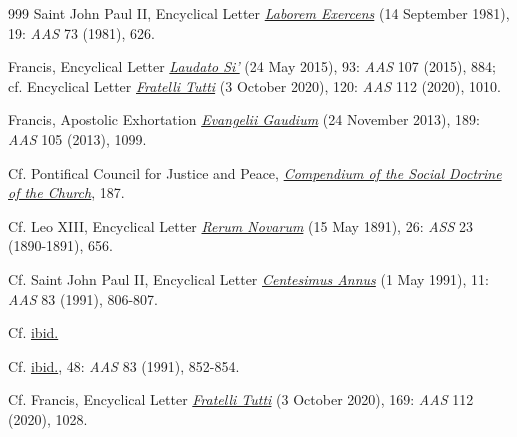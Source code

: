 \documentclass{article}
\begin{document}
\begin{thebibliography}{999}
 Saint John Paul II, Encyclical Letter \href{https://www.vatican.va/content/john-paul-ii/en/encyclicals/documents/hf_jp-ii_enc_14091981_laborem-exercens.html}{\emph{Laborem Exercens}} (14 September 1981), 19: \emph{AAS} 73 (1981), 626.

 Francis, Encyclical Letter \href{https://www.vatican.va/content/francesco/en/encyclicals/documents/papa-francesco_20150524_enciclica-laudato-si.html}{\emph{Laudato Si'}} (24 May 2015), 93: \emph{AAS} 107 (2015), 884; cf. Encyclical Letter \href{https://www.vatican.va/content/francesco/en/encyclicals/documents/papa-francesco_20201003_enciclica-fratelli-tutti.html}{\emph{Fratelli Tutti}} (3 October 2020), 120: \emph{AAS} 112 (2020), 1010.

 Francis, Apostolic Exhortation \href{https://www.vatican.va/content/francesco/en/apost_exhortations/documents/papa-francesco_esortazione-ap_20131124_evangelii-gaudium.html}{\emph{Evangelii Gaudium}} (24 November 2013), 189: \emph{AAS} 105 (2013), 1099.

 Cf. Pontifical Council for Justice and Peace, \href{https://www.vatican.va/roman_curia/pontifical_councils/justpeace/documents/rc_pc_justpeace_doc_20060526_compendio-dott-soc_en.html}{\emph{Compendium of the Social Doctrine of the Church}}, 187.

 Cf. Leo XIII, Encyclical Letter \href{https://www.vatican.va/content/leo-xiii/en/encyclicals/documents/hf_l-xiii_enc_15051891_rerum-novarum.html}{\emph{Rerum Novarum}} (15 May 1891), 26: \emph{ASS} 23 (1890-1891), 656.

 Cf. Saint John Paul II, Encyclical Letter \href{https://www.vatican.va/content/john-paul-ii/en/encyclicals/documents/hf_jp-ii_enc_01051991_centesimus-annus.html}{\emph{Centesimus Annus}} (1 May 1991), 11: \emph{AAS} 83 (1991), 806-807.

 Cf. \href{https://www.vatican.va/content/john-paul-ii/en/encyclicals/documents/hf_jp-ii_enc_01051991_centesimus-annus.html}{ibid.}

 Cf. \href{https://www.vatican.va/content/john-paul-ii/en/encyclicals/documents/hf_jp-ii_enc_01051991_centesimus-annus.html}{ibid.}, 48: \emph{AAS} 83 (1991), 852-854.

 Cf. Francis, Encyclical Letter \href{https://www.vatican.va/content/francesco/en/encyclicals/documents/papa-francesco_20201003_enciclica-fratelli-tutti.html}{\emph{Fratelli Tutti}} (3 October 2020), 169: \emph{AAS} 112 (2020), 1028.


\end{thebibliography}
\end{document}
